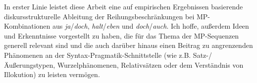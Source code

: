 \noindent
In erster Linie leistet diese Arbeit eine auf empirischen Ergebnissen basierende diskursstrukturelle Ableitung der Reihungsbeschränkungen bei MP-Kombinatio\-nen aus \textit{ja}/\textit{doch}, \textit{halt}/\textit{eben} und \textit{doch}/\textit{auch}. Ich hoffe, außerdem Ideen und Er\-kenntnisse vorgestellt zu haben, die für das Thema der MP-Sequenzen generell re\-levant sind und die auch darüber hinaus einen Beitrag zu angrenzenden Phänomenen an der Syntax-Pragmatik-Schnittstelle (wie z.B. Satz-/Äußerungstypen, Wur\-zelphänomenen, Relativsätzen oder dem Verständnis von Illokution) zu leisten vermögen.
















